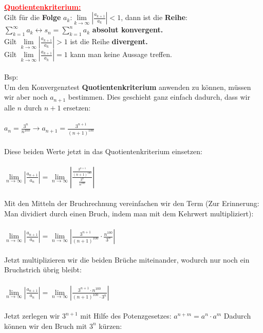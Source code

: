 \documentclass[12pt,a4paper]{article}
\begin{document}
\\\underline{\textbf{\textcolor{red}{Quotientenkriterium:}}}\\
Gilt für die \textbf{Folge} $a_k$:$\lim\limits_{k\rightarrow \infty}|\frac{a_{k+1}}{a_k}|<1$, dann ist die \textbf{Reihe}: $\sum\limits_{k=1}^{\infty}a_k\leftrightarrow s_n=\sum\limits_{k=1}^{n}a_k$ \textbf{absolut konvergent.}\\
Gilt $\lim\limits_{k\rightarrow \infty}|\frac{a_{k+1}}{a_k}|>1$ ist die Reihe \textbf{divergent.}\\
Gilt $\lim\limits_{k\rightarrow \infty}|\frac{a_{k+1}}{a_k}|=1$ kann man keine Aussage treffen.\\
\\Bsp:\\
Um den Konvergenztest \textbf{Quotientenkriterium} anwenden zu können,
müssen wir aber noch $a_{n+1}$ bestimmen. Dies geschieht ganz einfach dadurch,
dass wir alle $n$ durch $n+1$ ersetzen:\\
\\
$a_n=\frac{3^n}{n^{100}} \rightarrow a_{n+1}=\frac{3^{n+1}}{(n+1)^{100}}$\\
\\
Diese beiden Werte jetzt in das Quotientenkriterium einsetzen:\\
\\
$\lim\limits_{n\rightarrow\infty}|\frac{a_{n+1}}{a_n}|=\lim\limits_{n\rightarrow\infty}|\frac{\frac{3^{n+1}}{(n+1)^{100}}}{\frac{3^n}{n^{100}}}|$\\
\\
Mit den Mitteln der Bruchrechnung vereinfachen wir den Term (Zur Erinnerung:\\
Man dividiert durch einen Bruch, indem man mit dem Kehrwert multipliziert):\\
\\
$\lim\limits_{n\rightarrow\infty}|\frac{a_{n+1}}{a_n}|=\lim\limits_{n\rightarrow\infty}|\frac{3^{n+1}}{(n+1)^{100}}\cdot\frac{n^{100}}{3^n}|$\\
\\
Jetzt multiplizieren wir die beiden Brüche miteinander, wodurch
nur noch ein Bruchstrich übrig bleibt:\\
\\
$\lim\limits_{n\rightarrow\infty}|\frac{a_{n+1}}{a_n}|=\lim\limits_{n\rightarrow\infty}|\frac{3^{n+1}\cdot n^{100}}{(n+1)^{100}\cdot 3^n}|$\\
\\
Jetzt zerlegen wir $3^{n+1}$ mit Hilfe des Potenzgesetzes: $a^{n+m}=a^n\cdot a^m$
Dadurch können wir den Bruch mit $3^n$ kürzen:\\
\end{document}
